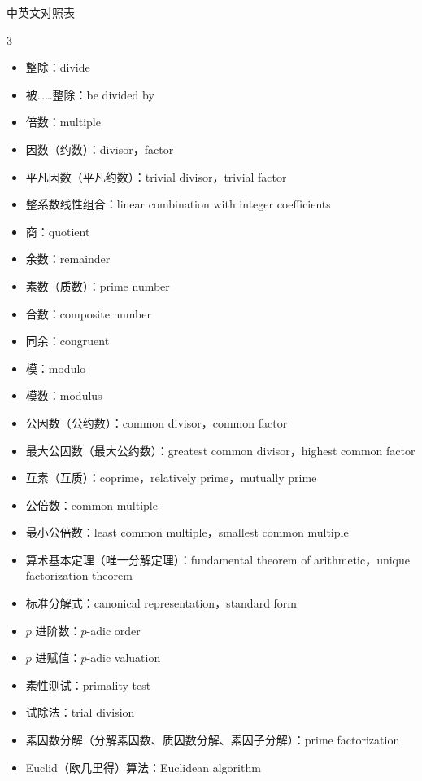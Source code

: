 \documentclass{../pkslide}
\begin{document}
\begin{frame}[c]{中英文对照表}
  \tiny
  
  \begin{adjustwidth}{-.5cm}{}
    \begin{mymulticols}[l][l]{3}
      \begin{itemize}
        \item 整除：divide
        \item 被……整除：be divided by
        \item 倍数：multiple
        \item 因数（约数）：divisor，factor
        \item 平凡因数（平凡约数）：trivial divisor，trivial factor
        \item 整系数线性组合：linear combination with integer coefficients
        \item 商：quotient
        \item 余数：remainder
        \item 素数（质数）：prime number
        \item 合数：composite number
        \item 同余：congruent
        \item 模：modulo
        \item 模数：modulus
        \item 公因数（公约数）：common divisor，common factor
        \item 最大公因数（最大公约数）：greatest common divisor，highest common factor
        \item 互素（互质）：coprime，relatively prime，mutually prime
        \item 公倍数：common multiple
        \item 最小公倍数：least common multiple，smallest common multiple
        \item 算术基本定理（唯一分解定理）：fundamental theorem of arithmetic，unique factorization theorem
        \item 标准分解式：canonical representation，standard form
        \item $p$ 进阶数：$p$-adic order
        \item $p$ 进赋值：$p$-adic valuation
        \item 素性测试：primality test
        \item 试除法：trial division
        \item 素因数分解（分解素因数、质因数分解、素因子分解）：prime factorization
        \item Euclid（欧几里得）算法：Euclidean algorithm

\end{itemize}
\end{mymulticols}
\end{adjustwidth}
\end{frame}
\end{document}
